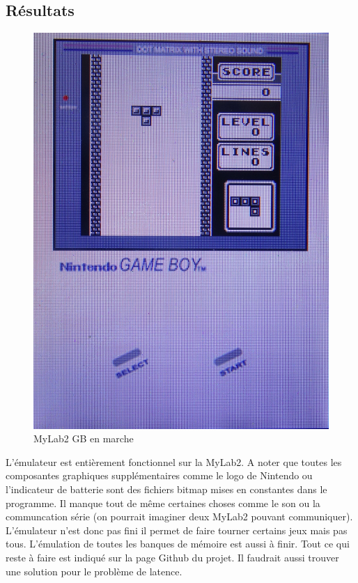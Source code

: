 \documentclass[a4paper]{article}
\begin{document}
\subsection{Résultats}
\begin{figure}[!h]
  \centering
  \includegraphics[scale=0.3]{images/mylab2gb.jpg}
  \caption{MyLab2 GB en marche}
\end{figure}
L'émulateur est entièrement fonctionnel sur la MyLab2. A noter que toutes les
composantes graphiques supplémentaires comme le logo de Nintendo ou l'indicateur
de batterie sont des fichiers bitmap mises en constantes dans le programme. Il
manque tout de même certaines choses comme le son ou la communcation série (on
pourrait imaginer deux MyLab2 pouvant communiquer). L'émulateur n'est donc pas fini
il permet de faire tourner certains jeux mais pas tous. L'émulation de toutes
les banques de mémoire est aussi à finir. Tout ce qui reste à faire est indiqué
sur la page Github du projet. Il faudrait aussi trouver une solution pour le
problème de latence.
\end{document}
